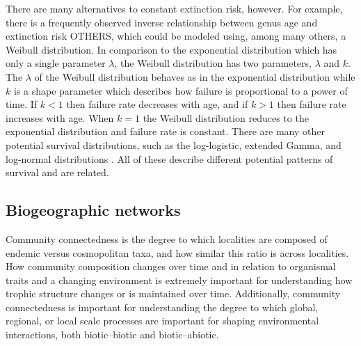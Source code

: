 \documentclass[12pt,letterpaper]{article}
\begin{document}
There are many alternatives to constant extinction risk, however. For example, there is a frequently observed inverse relationship between genus age and extinction risk \citep{Finnegan2008} OTHERS, which could be modeled using, among many others, a Weibull distribution. In comparison to the exponential distribution which has only a single parameter \(\lambda\), the Weibull distribution has two parameters, \(\lambda\) and \(k\). The \(\lambda\) of the Weibull distribution behaves as in the exponential distribution while \(k\) is a shape parameter which describes how failure is proportional to a power of time. If \(k < 1\) then failure rate decreases with age, and if \(k > 1\) then failure rate increases with age. When \(k = 1\) the Weibull distribution reduces to the exponential distribution and failure rate is constant. There are many other potential survival distributions, such as the log-logistic, extended Gamma, and log-normal distributions \citep{Kleinbaum2005}. All of these describe different potential patterns of survival and are related.


\subsection{Biogeographic networks}
Community connectedness is the degree to which localities are composed of endemic versus cosmopolitan taxa, and how similar this ratio is across localities. How community composition changes over time and in relation to organismal traits and a changing environment is extremely important for understanding how trophic structure changes or is maintained over time. Additionally, community connectedness is important for understanding the degree to which global, regional, or local scale processes are important for shaping environmental interactions, both biotic--biotic and biotic--abiotic.
\end{document}
